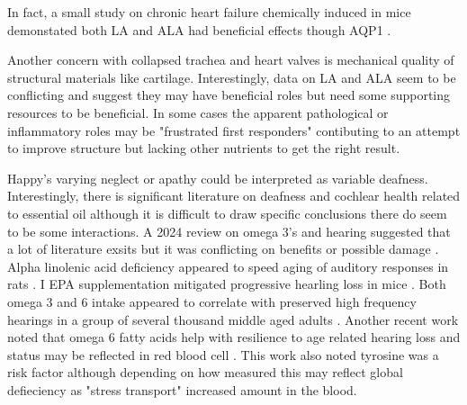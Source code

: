 In fact, a small study on chronic heart failure chemically induced
in mice demonstated both LA and ALA had beneficial effects though
AQP1 \cite{PMC12562890}.


Another concern with collapsed trachea and heart valves is mechanical
quality of structural materials  like cartilage. 
Interestingly, data on LA and ALA
seem to be conflicting and suggest they may have beneficial roles
but need some supporting resources to be beneficial. In some 
cases the apparent pathological or inflammatory roles may
be "frustrated first responders" contibuting to an attempt
to improve structure but lacking other nutrients to get the right result. 


Happy's varying neglect or apathy could be interpreted as variable
deafness. Interestingly, there is significant literature on deafness
and cochlear health related to essential oil although
it is difficult to draw specific conclusions there do seem to be
some interactions. 
A 2024 review on omega 3's and hearing suggested that a lot of 
literature exsits but it was conflicting on benefits or possible
damage \cite{Rahimi_Tavanai_Falahzadeh_Omega_fatty_acids_2024}.
Alpha linolenic acid deficiency appeared to speed aging
of auditory responses in rats
\cite{Bourre_Durand_Erre_Changes_Auditory_Brainstem_1999}.
I EPA supplementation mitigated progressive hearling loss in mice 
\cite{MARTINEZVEGA20151424}.
Both omega 3 and 6 intake appeared to correlate with preserved high
frequency hearings in a group of  several thousand middle aged adults
\cite{PMC12928906}.
Another recent work noted that omega 6 fatty acids help with resilience to
age related hearing loss and status may be reflected in red blood
cell \cite{Guo_Li_Luo_Metabolic_shifts_murine_2025}. This work
also noted tyrosine was a risk factor although depending on how
measured this may reflect global defieciency as "stress transport"
increased amount in the blood. 




